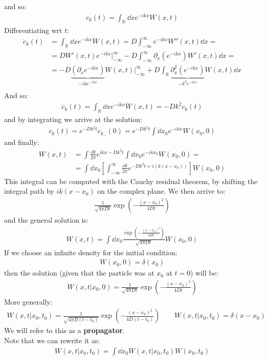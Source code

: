 \documentclass[../template.tex]{subfiles}
\begin{document}
and so:
\begin{align*}
    c_k(t) = \int_{\mathbb{R}} \dd{x} e^{-ikx} W(x,t)
\end{align*}
Differentiating wrt $t$:
\begin{align*}
    \dot{c}_k(t) &= \int_{\mathbb{R}} \dd{x} e^{-ikx} \dot{W}(x,t) = D \int_{-\infty}^{\infty} e^{-ikx} W''(x,t) \dd{x} =  \\
    &= D W'(x,t) e^{-ikx}\big|_{-\infty}^{\infty} - D \int_{-\infty}^{\infty} \partial_x (e^{-ikx}) W'(x,t) \dd{x} = \\
    &= -D\underbrace{(\partial_x e^{-ikx})}_{-ik e^{-ikx}} W(x,t) \big|_{-\infty}^{\infty} + D\int_{\mathbb{R}} \underbrace{\partial_x^2 (e^{-ikx})}_{-k^2 e^{-ikx}} W(x,t) \dd{x} \\
\end{align*} 
And so:
\begin{align*}
    \dot{c}_k(t) = \int_{\mathbb{R}} \dd{x} e^{-ikx} \dot{W}(x,t) = - D k^2 c_k(t)
\end{align*}
and by integrating we arrive at the solution:
\begin{align*}
    c_k(t) = e^{-D k^2 t} c_{k_-}(0) = e^{-D k^2 t} \int \dd{x_0} e^{-ikx} W(x_0,0)
\end{align*}
and finally:
\begin{align*}
    W(x,t) &= \int \frac{\dd{k}}{2 \pi} e^{ikx - Dk^2 t} \int \dd{x_0} e^{-ik x_0} W(x_0, 0) =\\
    &= \int \dd{x_0} \left[\int_{-\infty}^{\infty}  \frac{\dd{k}}{2 \pi}  e^{-D k^2 t + i(k(x-x_0))}\right] W(x_0, 0)
\end{align*}
This integral can be computed with the Cauchy residual theorem, by shifting the integral path by $ik(x-x_0)$ on the complex plane. We then arrive to:
\begin{align*}
    \frac{1}{\sqrt{4 \pi D t}} \exp\left(-\frac{(x-x_0)^2}{4 D t} \right) 
\end{align*} 
and the general solution is:
\begin{align*}
    W(x,t) = \int \dd{x_0} \frac{\exp \left(-\frac{(x-x_0)^2}{4 D t} \right)}{\sqrt{4 \pi D t}} W(x_0, 0) 
\end{align*}
If we choose an infinite density for the initial condition:
\begin{align*}
    W(x_0, 0) = \delta(x_0)
\end{align*}
then the solution (given that the particle was at $x_0$ at $t=0$) will be:
\begin{align*}
    W(x,t | x_0, 0) = \frac{1}{\sqrt{4 \pi D t}} \exp \left(-\frac{(x-x_0)^2}{4 D t} \right) 
\end{align*}
More generally:
\begin{align*}
    W(x,t | x_0, t_0 ) = \frac{1}{\sqrt{4 \pi D (t-t_0 )}} \exp \left(-\frac{(x-x_0 )^2}{4 D (t-t_0)} \right) \qquad W(x,t|x_0, t_0 ) = \delta(x- x_0)
\end{align*}
We will refer to this as a \textbf{propagator}.\\
Note that we can rewrite it as:
\begin{align*}
    W(x,t|x_0, t_0 ) = \int \dd{x_0 } W(x,t|x_0, t_0) W(x_0, t_0)
\end{align*} 
\end{document}
